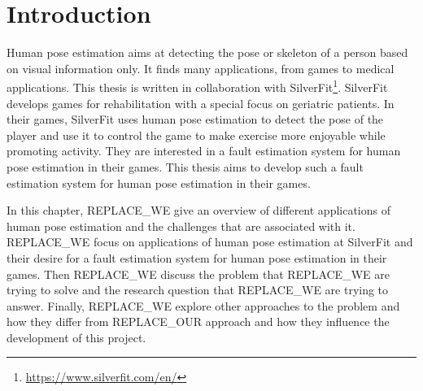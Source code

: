 \chapter{Introduction}
\setcounter{page}{1}

Human pose estimation aims at detecting the pose or skeleton of a person based on visual information only. It finds many applications, from games to medical applications. This thesis is written in collaboration with SilverFit\footnote{\url{https://www.silverfit.com/en/}}. SilverFit develops games for rehabilitation with a special focus on geriatric patients. In their games, SilverFit uses human pose estimation to detect the pose of the player and use it to control the game to make exercise more enjoyable while promoting activity. They are interested in a fault estimation system for human pose estimation in their games. This thesis aims to develop such a fault estimation system for human pose estimation in their games.

In this chapter, REPLACE_WE give an overview of different applications of human pose estimation and the challenges that are associated with it. REPLACE_WE focus on applications of human pose estimation at SilverFit and their desire for a fault estimation system for human pose estimation in their games. Then REPLACE_WE discuss the problem that REPLACE_WE are trying to solve and the research question that REPLACE_WE are trying to answer. Finally, REPLACE_WE explore other approaches to the problem and how they differ from REPLACE_OUR approach and how they influence the development of this project.





